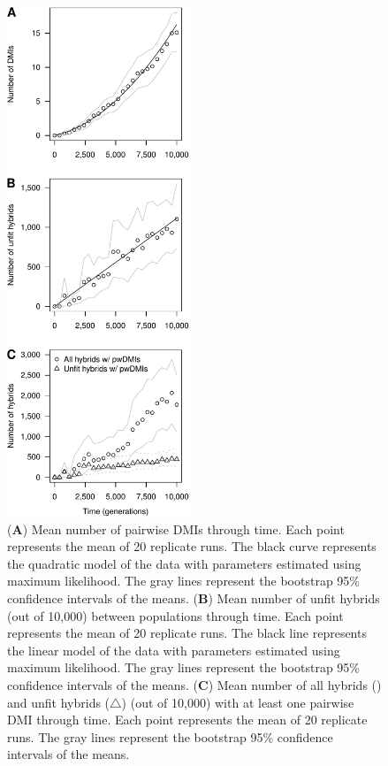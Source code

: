 \begin{doublespace}
\begin{figure}
\begin{center}
\includegraphics[height=6in]{dmi-and-hybrids.pdf}
\end{center}
\caption{
  (\textbf{A}) Mean number of pairwise DMIs through time.
  Each point represents the mean of 20 replicate runs.
  The black curve represents the quadratic model of the data
  with parameters estimated using maximum likelihood.
  The gray lines represent the bootstrap 95\% confidence intervals of the means.
  (\textbf{B}) Mean number of unfit hybrids (out of 10,000)
  between populations through time.
  Each point represents the mean of 20 replicate runs.
  The black line represents the linear model of the data
  with parameters estimated using maximum likelihood.
  The gray lines represent the bootstrap 95\% confidence intervals of the means.
  (\textbf{C}) Mean number of all hybrids () %
  and unfit hybrids ($\triangle$) (out of 10,000)
  with at least one pairwise DMI through time.
  Each point represents the mean of 20 replicate runs.
  The gray lines represent the bootstrap 95\%
  confidence intervals of the means.}
\label{dmi-and-hybrids}
\end{figure}




\end{doublespace}
